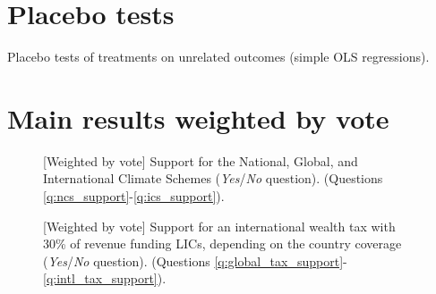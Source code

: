 \section{Placebo tests}\label{app:placebo}


\begin{table}[!htbp] 
  \caption{Placebo tests of treatments on unrelated outcomes (simple OLS regressions).} \label{tab:placebo} 
  \makebox[\textwidth][c]{}
\end{table} 


\clearpage
\section{Main results weighted by vote}\label{app:vote}

\begin{figure}[h!]
    \caption[{[}Weighted by vote{]} Support for the NCS, GCS, ICS]{[Weighted by vote] Support for the National, Global, and International Climate Schemes (\textit{Yes}/\textit{No} question). \hfill (Questions \ref{q:ncs_support}-\ref{q:ics_support}).
    }\label{fig:ics_weight_vote}
\end{figure}

\begin{figure}[h!]
    \caption[{[}Weighted by vote{]} Support for an int'l wealth tax depending on coverage]{[Weighted by vote] Support for an international wealth tax with 30\% of revenue funding LICs, depending on the country coverage (\textit{Yes}/\textit{No} question). \hfill (Questions \ref{q:global_tax_support}-\ref{q:intl_tax_support}).
    }\label{fig:wealth_tax_weight_vote}
\end{figure}

